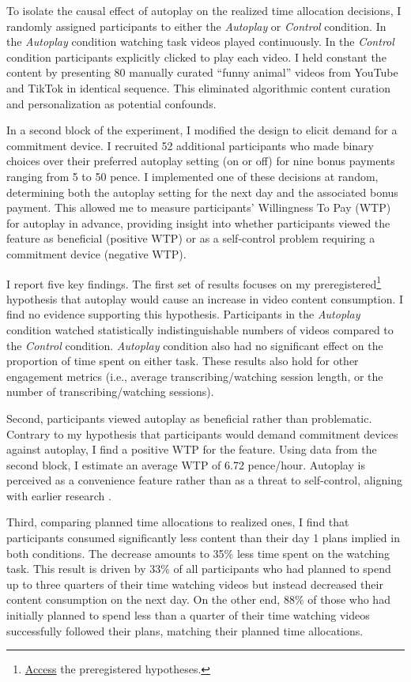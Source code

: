 \documentclass[11pt,a4paper,oneside]{article}
\begin{document}
To isolate the causal effect of autoplay on the realized time allocation decisions, I randomly assigned participants to either the \textit{Autoplay} or \textit{Control} condition. In the \textit{Autoplay} condition watching task videos played continuously. In the \textit{Control} condition participants explicitly clicked to play each video. I held constant the content by presenting 80 manually curated ``funny animal'' videos from YouTube and TikTok in identical sequence. This eliminated algorithmic content curation and personalization as potential confounds.

In a second block of the experiment, I modified the design to elicit demand for a commitment device. I recruited 52 additional participants who made binary choices over their preferred autoplay setting (on or off) for nine bonus payments ranging from 5 to 50 pence. I implemented one of these decisions at random, determining both the autoplay setting for the next day and the associated bonus payment. This allowed me to measure participants' Willingness To Pay (WTP) for autoplay in advance, providing insight into whether participants viewed the feature as beneficial (positive WTP) or as a self-control problem requiring a commitment device (negative WTP).

I report five key findings. The first set of results focuses on my preregistered\footnote{\href{https://doi.org/10.17605/OSF.IO/MFKBC}{Access} the preregistered hypotheses.} hypothesis that autoplay would cause an increase in video content consumption. I find no evidence supporting this hypothesis. Participants in the \textit{Autoplay} condition watched statistically indistinguishable numbers of videos compared to the \textit{Control} condition. \textit{Autoplay} condition also had no significant effect on the proportion of time spent on either task. These results also hold for other engagement metrics (i.e., average transcribing/watching session length, or the number of transcribing/watching sessions).

Second, participants viewed autoplay as beneficial rather than problematic. Contrary to my hypothesis that participants would demand commitment devices against autoplay, I find a positive WTP for the feature. Using data from the second block, I estimate an average WTP of 6.72 pence/hour. Autoplay is perceived as a convenience feature rather than as a threat to self-control, aligning with earlier research \citep{bongard2021definitely,schaffner2025pahi}.

Third, comparing planned time allocations to realized ones, I find that participants consumed significantly less content than their day 1 plans implied in both conditions. The decrease amounts to 35\% less time spent on the watching task. This result is driven by 33\% of all participants who had planned to spend up to three quarters of their time watching videos but instead decreased their content consumption on the next day. On the other end, 88\% of those who had initially planned to spend less than a quarter of their time watching videos successfully followed their plans, matching their planned time allocations.
\end{document}

